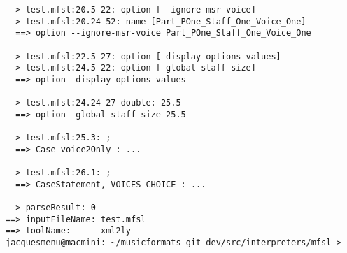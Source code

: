 \begin{lstlisting}[language=Terminal]
--> test.mfsl:20.5-22: option [--ignore-msr-voice]
--> test.mfsl:20.24-52: name [Part_POne_Staff_One_Voice_One]
  ==> option --ignore-msr-voice Part_POne_Staff_One_Voice_One

--> test.mfsl:22.5-27: option [-display-options-values]
--> test.mfsl:24.5-22: option [-global-staff-size]
  ==> option -display-options-values

--> test.mfsl:24.24-27 double: 25.5
  ==> option -global-staff-size 25.5

--> test.mfsl:25.3: ;
  ==> Case voice2Only : ...

--> test.mfsl:26.1: ;
  ==> CaseStatement, VOICES_CHOICE : ...

--> parseResult: 0
==> inputFileName: test.mfsl
==> toolName:      xml2ly
jacquesmenu@macmini: ~/musicformats-git-dev/src/interpreters/mfsl >
\end{lstlisting}

